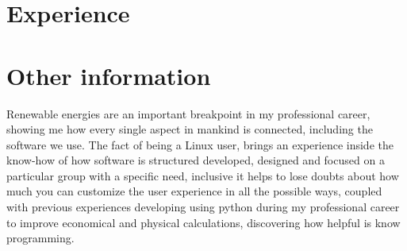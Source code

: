 \documentclass[letterpaper]{twentysecondcv} %
\begin{document}
\section{Experience}

\begin{twenty} %
\end{twenty}


\section{Other information}

Renewable energies are an important breakpoint in my professional career, showing me how every single aspect in mankind is connected, including the software we use. The fact of being a Linux user, brings an experience inside the know-how of how software is structured developed, designed and focused on a particular group with a specific need, inclusive it helps to lose doubts about how much you can customize the user experience in all the possible ways, coupled with previous experiences developing using python during my professional career to improve economical and physical calculations, discovering how helpful is know programming.






\end{document}
